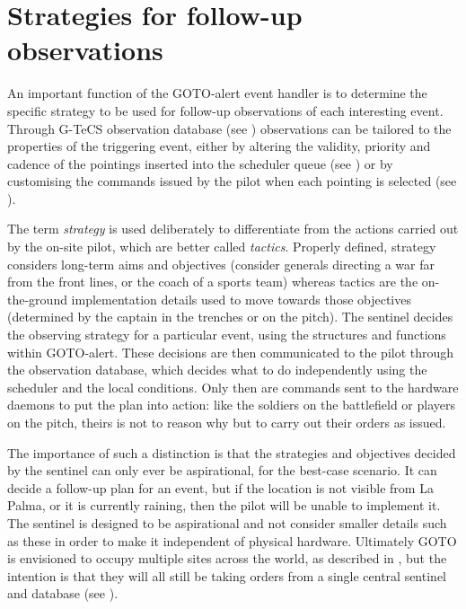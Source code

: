 \section{Strategies for follow-up observations}
\label{sec:strategy}
\begin{colsection}


\begin{colsection}

An important function of the GOTO-alert event handler is to determine the specific strategy to be used for follow-up observations of each interesting event. Through G-TeCS observation database (see ) observations can be tailored to the properties of the triggering event, either by altering the validity, priority and cadence of the pointings inserted into the scheduler queue (see ) or by customising the commands issued by the pilot when each pointing is selected (see ).

The term \emph{strategy} is used deliberately to differentiate from the actions carried out by the on-site pilot, which are better called \emph{tactics}. Properly defined, strategy considers long-term aims and objectives (consider generals directing a war far from the front lines, or the coach of a sports team) whereas tactics are the on-the-ground implementation details used to move towards those objectives (determined by the captain in the trenches or on the pitch). The sentinel decides the observing strategy for a particular event, using the structures and functions within GOTO-alert. These decisions are then communicated to the pilot through the observation database, which decides what to do independently using the scheduler and the local conditions. Only then are commands sent to the hardware daemons to put the plan into action: like the soldiers on the battlefield or players on the pitch, theirs is not to reason why but to carry out their orders as issued.

The importance of such a distinction is that the strategies and objectives decided by the sentinel can only ever be aspirational, for the best-case scenario. It can decide a follow-up plan for an event, but if the location is not visible from La Palma, or it is currently raining, then the pilot will be unable to implement it. The sentinel is designed to be aspirational and not consider smaller details such as these in order to make it independent of physical hardware. Ultimately GOTO is envisioned to occupy multiple sites across the world, as described in , but the intention is that they will all still be taking orders from a single central sentinel and database (see ).


\end{colsection}
\end{colsection}
